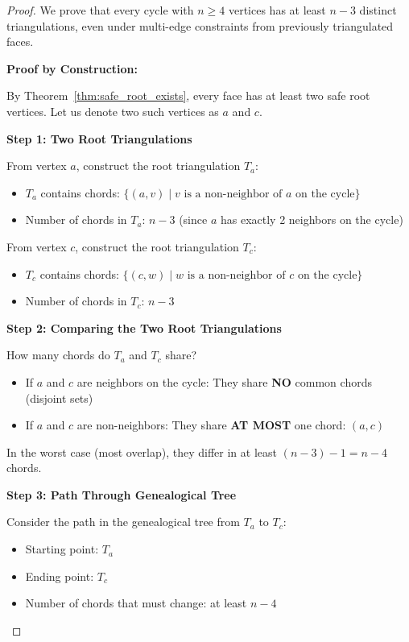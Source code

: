 \documentclass[12pt,a4paper]{article}
\theoremstyle{definition}
\theoremstyle{remark}
\begin{document}
\begin{proof}
We prove that every cycle with $n \geq 4$ vertices has at least $n - 3$ distinct triangulations, even under multi-edge constraints from previously triangulated faces.

\textbf{Proof by Construction:}

By Theorem~\ref{thm:safe_root_exists}, every face has at least two safe root vertices. Let us denote two such vertices as $a$ and $c$.

\textbf{Step 1: Two Root Triangulations}

From vertex $a$, construct the root triangulation $T_a$:
\begin{itemize}
    \item $T_a$ contains chords: $\{(a, v) \mid v \text{ is a non-neighbor of } a \text{ on the cycle}\}$
    \item Number of chords in $T_a$: $n - 3$ (since $a$ has exactly 2 neighbors on the cycle)
\end{itemize}

From vertex $c$, construct the root triangulation $T_c$:
\begin{itemize}
    \item $T_c$ contains chords: $\{(c, w) \mid w \text{ is a non-neighbor of } c \text{ on the cycle}\}$
    \item Number of chords in $T_c$: $n - 3$
\end{itemize}

\textbf{Step 2: Comparing the Two Root Triangulations}

How many chords do $T_a$ and $T_c$ share?

\begin{itemize}
    \item If $a$ and $c$ are neighbors on the cycle: They share \textbf{NO} common chords (disjoint sets)
    \item If $a$ and $c$ are non-neighbors: They share \textbf{AT MOST} one chord: $(a,c)$
\end{itemize}

In the worst case (most overlap), they differ in at least $(n-3) - 1 = n - 4$ chords.

\textbf{Step 3: Path Through Genealogical Tree}

Consider the path in the genealogical tree from $T_a$ to $T_c$:
\begin{itemize}
    \item Starting point: $T_a$
    \item Ending point: $T_c$  
    \item Number of chords that must change: at least $n - 4$
\end{itemize}


\end{proof}
\end{document}
